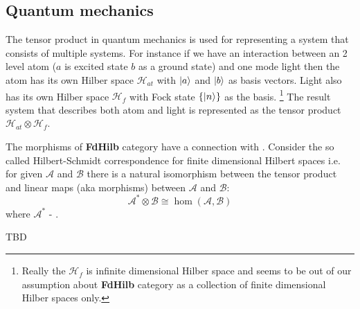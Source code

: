 \subsection{Quantum mechanics}

The tensor product in quantum mechanics is used for
representing a system that consists of multiple systems. For instance
if we have an interaction between an 2 level atom ($a$ is excited
state $b$ as a ground state) and one mode light then the
atom has its own Hilber space $\mathcal{H}_{at}$ with $\ket{a}$ and
$\ket{b}$ as basis 
vectors.  Light also has its own Hilber space $\mathcal{H}_f$ with Fock state
$\{\ket{n}\}$ as the basis.
\footnote{
  Really the $\mathcal{H}_f$ is infinite dimensional Hilber space and
  seems to be out of our assumption about \textbf{FdHilb} category as
  a collection of finite dimensional Hilber spaces only.
}
The result system that describes both atom
and light is represented as the tensor product $\mathcal{H}_{at}
\otimes \mathcal{H}_f$.

The morphisms of \textbf{FdHilb} category have a connection with
. Consider the so called Hilbert-Schmidt
correspondence for finite dimensional Hilbert spaces i.e. for given
$\mathcal{A}$ and $\mathcal{B}$ there is a natural isomorphism between
the tensor product and linear maps (aka morphisms) between
$\mathcal{A}$ and $\mathcal{B}$:
\[
\mathcal{A}^\ast \otimes \mathcal{B} \cong \hom(\mathcal{A}, \mathcal{B})
\]
where $\mathcal{A}^\ast$ - .


TBD
